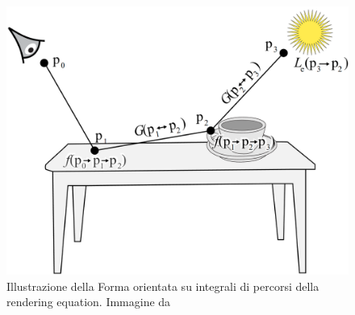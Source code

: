 \begin{figure}[tb]
	\centering
	\includegraphics[width=0.8\linewidth]{../assets/chapter8_light_transport_equation.png}
	\caption{Illustrazione della Forma orientata su integrali di percorsi della rendering equation. Immagine da \cite{pharr}}
	\label{chapter8:LTE:pathFig}
\end{figure}
